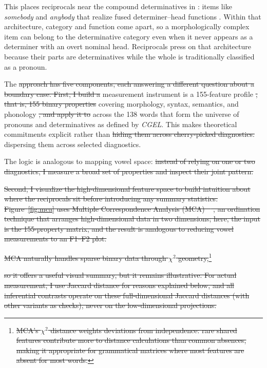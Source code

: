 \documentclass[12pt]{article}
\providecommand{\mention}[1]{\textit{#1}}
\providecommand{\DIFaddtex}[1]{{\protect\color{DIFgreen}#1}} %
\providecommand{\DIFdeltex}[1]{{\protect\color{red}\sout{#1}}}                      %
\providecommand{\DIFaddbegin}{} %
\providecommand{\DIFaddend}{} %
\providecommand{\DIFdelbegin}{} %
\providecommand{\DIFdelend}{} %
\providecommand{\DIFadd}[1]{\texorpdfstring{\DIFaddtex{#1}}{#1}} %
\providecommand{\DIFdel}[1]{\texorpdfstring{\DIFdeltex{#1}}{}} %
\newcommand{\DIFscaledelfig}{0.5}
\newlength{\DIFdelgraphicswidth} %
\newlength{\DIFdelgraphicsheight} %
\newcommand{\DIFaddincludegraphics}[2][]{{\color{DIFgreen}\fbox{\DIFOincludegraphics[#1]{#2}}}} %
\newcommand{\DIFdelincludegraphics}[2][]{%
\sbox{\DIFdelgraphicsbox}{\DIFOincludegraphics[#1]{#2}}%
\settoboxwidth{\DIFdelgraphicswidth}{\DIFdelgraphicsbox} %
\settoboxtotalheight{\DIFdelgraphicsheight}{\DIFdelgraphicsbox} %
\scalebox{\DIFscaledelfig}{%
\parbox[b]{\DIFdelgraphicswidth}{\usebox{\DIFdelgraphicsbox}\\[-\baselineskip] \rule{\DIFdelgraphicswidth}{0em}}\llap{\resizebox{\DIFdelgraphicswidth}{\DIFdelgraphicsheight}{%
\setlength{\unitlength}{\DIFdelgraphicswidth}%
\begin{picture}(1,1)%
\thicklines\linethickness{2pt} %
{\color[rgb]{1,0,0}\put(0,0){\framebox(1,1){}}}%
{\color[rgb]{1,0,0}\put(0,0){\line( 1,1){1}}}%
{\color[rgb]{1,0,0}\put(0,1){\line(1,-1){1}}}%
\end{picture}%
}\hspace*{3pt}}} %
} %
\DeclareRobustCommand{\DIFaddbegin}{\DIFOaddbegin \let\includegraphics\DIFaddincludegraphics} %
\DeclareRobustCommand{\DIFaddend}{\DIFOaddend \let\includegraphics\DIFOincludegraphics} %
\DeclareRobustCommand{\DIFdelbegin}{\DIFOdelbegin \let\includegraphics\DIFdelincludegraphics} %
\DeclareRobustCommand{\DIFdelend}{\DIFOaddend \let\includegraphics\DIFOincludegraphics} %
\begin{document}
\DIFaddend This places reciprocals near the compound determinatives in \textcite[henceforth \textit{CGEL}; Ch. 5 \S9.6]{huddleston2002}: items like \mention{somebody} and \mention{anybody} that realize fused determiner--head functions \parencite{Payne2007}. Within that architecture, category and function come apart, so a morphologically complex item can belong to the determinative category even when it never appears as a determiner with an overt nominal head. Reciprocals press on that architecture because their parts are determinatives while the whole is traditionally classified as a pronoun.
\DIFdelbegin %
\DIFdelend 

The \DIFdelbegin \DIFdel{approach has five components, each answering a different question about a boundary case. First, I build a }\DIFdelend \DIFaddbegin \DIFadd{measurement instrument is a }\DIFaddend 155-feature profile \DIFdelbegin \DIFdel{, that is, 155 binary properties }\DIFdelend covering morphology, syntax, semantics, and phonology \DIFdelbegin \DIFdel{, and apply it to }\DIFdelend \DIFaddbegin \DIFadd{across }\DIFaddend the 138 words that form the universe of pronouns and determinatives as defined by \textit{CGEL}. This makes theoretical commitments explicit rather than \DIFdelbegin \DIFdel{hiding them across cherry-picked diagnostics.
}\DIFdelend \DIFaddbegin \DIFadd{dispersing them across selected diagnostics.
}

\DIFaddend The logic is analogous to mapping vowel space: \DIFdelbegin \DIFdel{instead of relying on one or two diagnostics, I measure a broad set of properties and inspect their joint pattern.
}%

\DIFdel{Second, I visualize the high-dimensional feature space to build intuition about where the reciprocals sit before introducing any summary statistics. Figure~\ref{fig:mca} uses Multiple Correspondence Analysis (MCA) \mbox{%
\parencite{greenacre2017correspondence}}\hskip0pt%
, an ordination technique that arranges high-dimensional data in two dimensions; here, the input is the 155-property matrix, and the result is analogous to reducing vowel measurements to an F1--F2 plot.
}%

\DIFdel{MCA naturally handles sparse binary data through $\chi^2$ geometry,}\footnote{\DIFdel{MCA's $\chi^2$ distance weights deviations from independence: rare shared features contribute more to distance calculations than common absences, making it appropriate for grammatical matrices where most features are absent for most words.}} %
\addtocounter{footnote}{-1}%
\DIFdel{so it offers a useful visual summary, but it remains illustrative. For actual measurement, I use Jaccard distance for reasons explained below, and all inferential contrasts operate on these full-dimensional Jaccard distances (with other variants as checks), never on the low-dimensional projections.
}%
\end{document}
